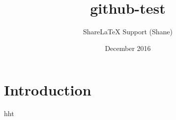 \documentclass{article}
\title{github-test}
\author{ShareLaTeX Support (Shane)}
\date{December 2016}
\begin{document}
\maketitle

\section{Introduction}



hht
\end{document}
